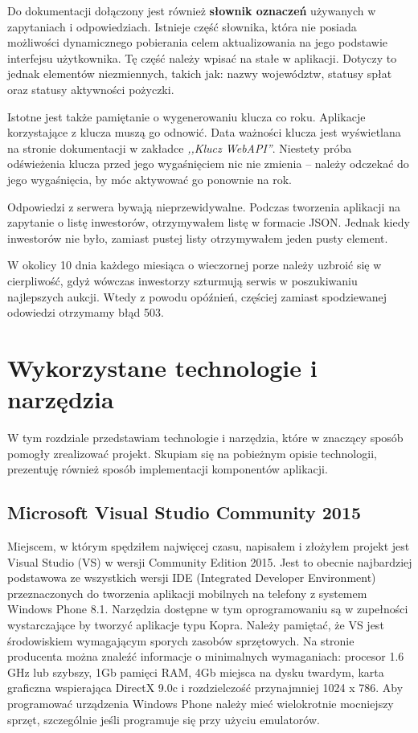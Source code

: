 \documentclass[a4paper,twoside,titlepage,openright]{book}
\begin{document}
Do dokumentacji dołączony jest również \textbf{słownik oznaczeń} używanych w zapytaniach i odpowiedziach. Istnieje część słownika, która nie posiada możliwości dynamicznego pobierania celem aktualizowania na jego podstawie interfejsu użytkownika. Tę część należy wpisać na stałe w aplikacji. Dotyczy to jednak elementów niezmiennych, takich jak: nazwy województw, statusy spłat oraz statusy aktywności pożyczki. 

Istotne jest także pamiętanie o wygenerowaniu klucza co roku. Aplikacje korzystające z klucza muszą go odnowić. Data ważności klucza jest wyświetlana na stronie dokumentacji w zakładce \textit{,,Klucz WebAPI''}. Niestety próba odświeżenia klucza przed jego wygaśnięciem nic nie zmienia -- należy odczekać do jego wygaśnięcia, by móc aktywować go ponownie na rok. 

Odpowiedzi z serwera bywają nieprzewidywalne. Podczas tworzenia aplikacji na zapytanie o listę inwestorów, otrzymywałem listę w formacie JSON. Jednak kiedy inwestorów nie było, zamiast pustej listy otrzymywałem jeden pusty element. 

W okolicy 10 dnia każdego miesiąca o wieczornej porze należy uzbroić się w cierpliwość, gdyż wówczas inwestorzy szturmują serwis w poszukiwaniu najlepszych aukcji. Wtedy z powodu opóźnień, częściej zamiast spodziewanej odowiedzi otrzymamy błąd 503.


\clearpage{\pagestyle{empty}\cleardoublepage}
\chapter{Wykorzystane technologie i narzędzia}
W tym rozdziale przedstawiam technologie i narzędzia, które w znaczący sposób pomogły zrealizować projekt. Skupiam się na pobieżnym opisie technologii, prezentuję również sposób implementacji komponentów aplikacji.

\section{Microsoft Visual Studio Community 2015}
Miejscem, w którym spędziłem najwięcej czasu, napisałem i złożyłem projekt jest Visual Studio (VS) w wersji Community Edition 2015. Jest to obecnie najbardziej podstawowa ze wszystkich wersji IDE (Integrated Developer Environment) przeznaczonych do tworzenia aplikacji mobilnych na telefony z systemem Windows Phone 8.1. Narzędzia dostępne w tym oprogramowaniu są w zupełności wystarczające by tworzyć aplikacje typu Kopra. Należy pamiętać, że VS jest środowiskiem wymagającym sporych zasobów sprzętowych. Na stronie producenta \cite{vs} można znaleźć informacje o minimalnych wymaganiach: procesor 1.6 GHz lub szybszy, 1Gb pamięci RAM, 4Gb miejsca na dysku twardym, karta graficzna wspierająca DirectX 9.0c i rozdzielczość przynajmniej 1024 x 786. Aby programować urządzenia Windows Phone należy mieć wielokrotnie mocniejszy sprzęt, szczególnie jeśli programuje się przy użyciu emulatorów.
\end{document}
